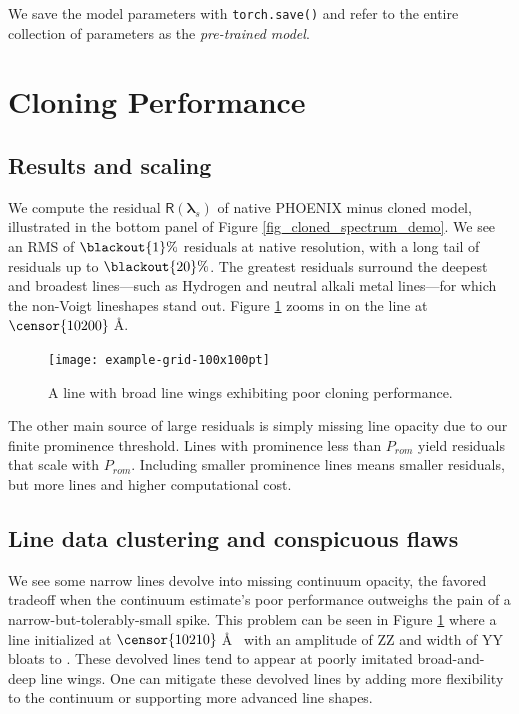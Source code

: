 \documentclass[modern]{aastex631}
\begin{document}
We save the model parameters with \texttt{torch.save()} and refer to the entire collection of parameters as the \emph{pre-trained model}.

\section{Cloning Performance}

\subsection{Results and scaling}

We compute the residual $\mathsf{R}(\bm{\lambda}_s)$ of native PHOENIX minus cloned model, illustrated in the bottom panel of Figure \ref{fig_cloned_spectrum_demo}. We see an RMS of $\blackout{1}\%$ residuals at native resolution, with a long tail of residuals up to $\blackout{20}\%$. The greatest residuals surround the deepest and broadest lines---such as Hydrogen and neutral alkali metal lines---for which the non-Voigt lineshapes stand out. Figure \ref{fig_poor_cloning_performance} zooms in on the  line at $\censor{10200}\;$\AA.

\begin{figure}[hbt!]
 \centering
 \texttt{[image: example-grid-100x100pt]}
 \caption{A  line with broad line wings exhibiting poor cloning performance.}
 \label{fig_poor_cloning_performance}
\end{figure}

The other main source of large residuals is simply missing line opacity due to our finite prominence threshold. Lines with prominence less than $P_{rom}$ yield residuals that scale with $P_{rom}$. Including smaller prominence lines means smaller residuals, but more lines and higher computational cost.


\subsection{Line data clustering and conspicuous flaws}
We see some narrow lines devolve into missing continuum opacity, the favored tradeoff when the continuum estimate's poor performance outweighs the pain of a narrow-but-tolerably-small spike. This problem can be seen in Figure \ref{fig_poor_cloning_performance} where a line initialized at $\censor{10210}\;$\AA~ with an amplitude of ZZ and width of YY bloats to . These devolved lines tend to appear at poorly imitated broad-and-deep line wings. One can mitigate these devolved lines by adding more flexibility to the continuum or supporting more advanced line shapes.
\end{document}
